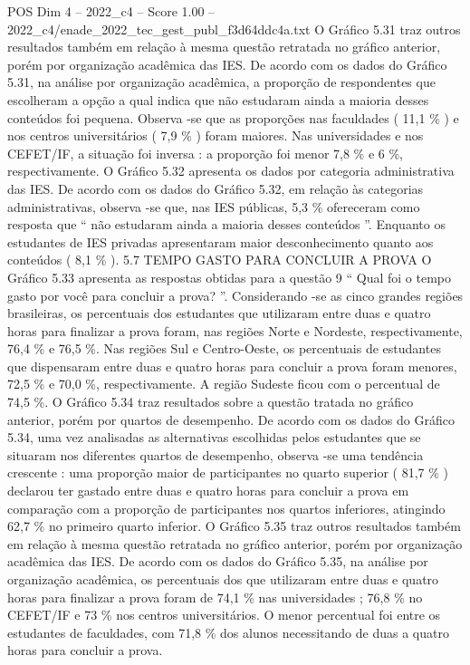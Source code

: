 \begin{textsample}{POS Dim 4 – 2022\_c4 – Score 1.00 – 2022\_c4/enade\_2022\_tec\_gest\_publ\_f3d64ddc4a.txt}
O Gráfico 5.31 traz outros resultados também em relação à mesma questão retratada no gráfico anterior, porém por organização acadêmica das IES.
De acordo com os dados do Gráfico 5.31, na análise por organização acadêmica, a proporção de respondentes que escolheram a opção a qual indica que não estudaram ainda a maioria desses conteúdos foi pequena.
Observa -se que as proporções nas faculdades ( 11,1 \% ) e nos centros universitários ( 7,9 \% ) foram maiores.
Nas universidades e nos CEFET/IF, a situação foi inversa : a proporção foi menor 7,8 \% e 6 \%, respectivamente.
O Gráfico 5.32 apresenta os dados por categoria administrativa das IES.
De acordo com os dados do Gráfico 5.32, em relação às categorias administrativas, observa -se que, nas IES públicas, 5,3 \% ofereceram como resposta que “ não estudaram ainda a maioria desses conteúdos ”.
Enquanto os estudantes de IES privadas apresentaram maior desconhecimento quanto aos conteúdos ( 8,1 \% ). 5.7 TEMPO GASTO PARA CONCLUIR A PROVA O Gráfico 5.33 apresenta as respostas obtidas para a questão 9 “ Qual foi o tempo gasto por você para concluir a prova? ”.
Considerando -se as cinco grandes regiões brasileiras, os percentuais dos estudantes que utilizaram entre duas e quatro horas para finalizar a prova foram, nas regiões Norte e Nordeste, respectivamente, 76,4 \% e 76,5 \%.
Nas regiões Sul e Centro-Oeste, os percentuais de estudantes que dispensaram entre duas e quatro horas para concluir a prova foram menores, 72,5 \% e 70,0 \%, respectivamente.
A região Sudeste ficou com o percentual de 74,5 \%.
O Gráfico 5.34 traz resultados sobre a questão tratada no gráfico anterior, porém por quartos de desempenho.
De acordo com os dados do Gráfico 5.34, uma vez analisadas as alternativas escolhidas pelos estudantes que se situaram nos diferentes quartos de desempenho, observa -se uma tendência crescente : uma proporção maior de participantes no quarto superior ( 81,7 \% ) declarou ter gastado entre duas e quatro horas para concluir a prova em comparação com a proporção de participantes nos quartos inferiores, atingindo 62,7 \% no primeiro quarto inferior.
O Gráfico 5.35 traz outros resultados também em relação à mesma questão retratada no gráfico anterior, porém por organização acadêmica das IES.
De acordo com os dados do Gráfico 5.35, na análise por organização acadêmica, os percentuais dos que utilizaram entre duas e quatro horas para finalizar a prova foram de 74,1 \% nas universidades ; 76,8 \% no CEFET/IF e 73 \% nos centros universitários.
O menor percentual foi entre os estudantes de faculdades, com 71,8 \% dos alunos necessitando de duas a quatro horas para concluir a prova.

\end{textsample}
